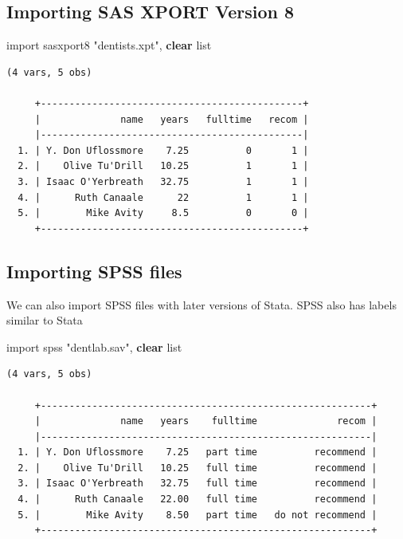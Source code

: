 \documentclass[
]{book}
\newenvironment{Shaded}{\begin{snugshade}}{\end{snugshade}}
\newcommand{\KeywordTok}[1]{\textcolor[rgb]{0.13,0.29,0.53}{\textbf{#1}}}
\newcommand{\NormalTok}[1]{#1}
\newcommand{\OtherTok}[1]{\textcolor[rgb]{0.56,0.35,0.01}{#1}}
\newcommand{\StringTok}[1]{\textcolor[rgb]{0.31,0.60,0.02}{#1}}
\begin{document}
\subsection{Importing SAS XPORT Version 8}\label{importing-sas-xport-version-8}

\begin{Shaded}
\begin{Highlighting}[]
\NormalTok{import sasxport8 }\StringTok{"dentists.xpt"}\NormalTok{, }\KeywordTok{clear}
\OtherTok{list}
\end{Highlighting}
\end{Shaded}

\begin{verbatim}
(4 vars, 5 obs)

     +----------------------------------------------+
     |              name   years   fulltime   recom |
     |----------------------------------------------|
  1. | Y. Don Uflossmore    7.25          0       1 |
  2. |    Olive Tu'Drill   10.25          1       1 |
  3. | Isaac O'Yerbreath   32.75          1       1 |
  4. |      Ruth Canaale      22          1       1 |
  5. |        Mike Avity     8.5          0       0 |
     +----------------------------------------------+
\end{verbatim}

\subsection{Importing SPSS files}\label{importing-spss-files}

We can also import SPSS files with later versions of Stata. SPSS also has labels similar to Stata

\begin{Shaded}
\begin{Highlighting}[]
\NormalTok{import spss }\StringTok{"dentlab.sav"}\NormalTok{, }\KeywordTok{clear}
\OtherTok{list}
\end{Highlighting}
\end{Shaded}

\begin{verbatim}
(4 vars, 5 obs)

     +----------------------------------------------------------+
     |              name   years    fulltime              recom |
     |----------------------------------------------------------|
  1. | Y. Don Uflossmore    7.25   part time          recommend |
  2. |    Olive Tu'Drill   10.25   full time          recommend |
  3. | Isaac O'Yerbreath   32.75   full time          recommend |
  4. |      Ruth Canaale   22.00   full time          recommend |
  5. |        Mike Avity    8.50   part time   do not recommend |
     +----------------------------------------------------------+
\end{verbatim}
\end{document}
